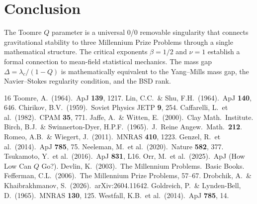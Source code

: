 \documentclass[11pt]{article}
\begin{document}
\section{Conclusion}

The Toomre $Q$ parameter is a universal 0/0 removable singularity that
connects gravitational stability to three Millennium Prize Problems
through a single mathematical structure.  The critical exponents
$\beta = 1/2$ and $\nu = 1$ establish a formal connection to mean-field
statistical mechanics.  The mass gap $\Delta = \lambda_c/(1-Q)$ is
mathematically equivalent to the Yang--Mills mass gap, the Navier--Stokes
regularity condition, and the BSD rank.

\begin{thebibliography}{16}
 Toomre, A.\ (1964).\ ApJ \textbf{139}, 1217.
 Lin, C.C.\ \& Shu, F.H.\ (1964).\ ApJ \textbf{140}, 646.
 Chirikov, B.V.\ (1959).\ Soviet Physics JETP \textbf{9}, 254.
 Caffarelli, L.\ et al.\ (1982).\ CPAM \textbf{35}, 771.
 Jaffe, A.\ \& Witten, E.\ (2000).\ Clay Math.\ Institute.
 Birch, B.J.\ \& Swinnerton-Dyer, H.P.F.\ (1965).\ J.\ Reine Angew.\ Math.\ \textbf{212}.
 Romeo, A.B.\ \& Wiegert, J.\ (2011).\ MNRAS \textbf{410}, 1223.
 Genzel, R.\ et al.\ (2014).\ ApJ \textbf{785}, 75.
 Neeleman, M.\ et al.\ (2020).\ Nature \textbf{582}, 377.
 Tsukamoto, Y.\ et al.\ (2016).\ ApJ \textbf{831}, L16.
 Orr, M.\ et al.\ (2025).\ ApJ (How Low Can $Q$ Go?).
 Devlin, K.\ (2003).\ The Millennium Problems.\ Basic Books.
 Fefferman, C.L.\ (2006).\ The Millennium Prize Problems, 57--67.
 Drobchik, A.\ \& Khaibrakhmanov, S.\ (2026).\ arXiv:2604.11642.
 Goldreich, P.\ \& Lynden-Bell, D.\ (1965).\ MNRAS \textbf{130}, 125.
 Westfall, K.B.\ et al.\ (2014).\ ApJ \textbf{785}, 14.
\end{thebibliography}
\end{document}

